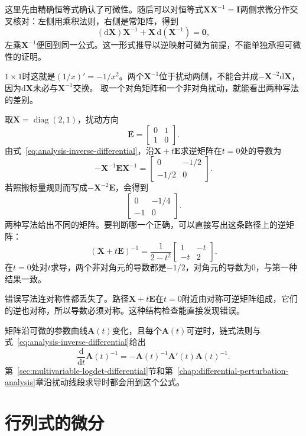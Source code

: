 这里先由精确恒等式确认了可微性。随后可以对恒等式$\bm{X}\bm{X}^{-1}=\bm{I}$两侧求微分作交叉核对：左侧用乘积法则，右侧是常矩阵，得到
\[
 (\mathrm{d}\bm{X})\bm{X}^{-1}+\bm{X}\,\mathrm{d}(\bm{X}^{-1})=\bm{0},
\]
左乘$\bm{X}^{-1}$便回到同一公式。这一形式推导以逆映射可微为前提，不能单独承担可微性的证明。

$1\times1$时这就是$(1/x)'=-1/x^2$。两个$\bm{X}^{-1}$位于扰动两侧，不能合并成$-\bm{X}^{-2}\mathrm{d}\bm{X}$，因为$\mathrm{d}\bm{X}$未必与$\bm{X}^{-1}$交换。
取一个对角矩阵和一个非对角扰动，就能看出两种写法的差别。
\begin{example}[逆矩阵微分中的乘法次序]
\label{ex:analysis-noncommuting-inverse-differential}
取$\bm X=\operatorname{diag}(2,1)$，扰动方向
\[
 \bm E=\begin{bmatrix}0&1\\1&0\end{bmatrix}.
\]
由式~\eqref{eq:analysis-inverse-differential}，沿$\bm X+t\bm E$求逆矩阵在$t=0$处的导数为
\[
 -\bm X^{-1}\bm E\bm X^{-1}
 =\begin{bmatrix}0&-1/2\\-1/2&0\end{bmatrix}.
\]
若照搬标量规则而写成$-\bm X^{-2}\bm E$，会得到
\[
 \begin{bmatrix}0&-1/4\\-1&0\end{bmatrix}.
\]
两种写法给出不同的矩阵。要判断哪一个正确，可以直接写出这条路径上的逆矩阵：
\[
 (\bm X+t\bm E)^{-1}=\frac1{2-t^2}\begin{bmatrix}1&-t\\-t&2\end{bmatrix}.
\]
在$t=0$处对$t$求导，两个非对角元的导数都是$-1/2$，对角元的导数为$0$，与第一种结果一致。
\end{example}

错误写法连对称性都丢失了。路径$\bm X+t\bm E$在$t=0$附近由对称可逆矩阵组成，它们的逆也对称，所以导数必须对称。这种结构检查能直接发现错误。

矩阵沿可微的参数曲线$\bm A(t)$变化，且每个$\bm A(t)$可逆时，链式法则与式~\eqref{eq:analysis-inverse-differential}给出
\begin{equation}
 \frac{\mathrm d}{\mathrm dt}\bm A(t)^{-1}=-\bm A(t)^{-1}\bm A'(t)\bm A(t)^{-1}.
\label{eq:multivariable-inverse-curve-derivative}
\end{equation}
第~\ref{sec:multivariable-logdet-differential}节和第~\ref{chap:differential-perturbation-analysis}章沿扰动线段求导时都会用到这个公式。

\section{行列式的微分}
\label{sec:multivariable-determinant-differential}

